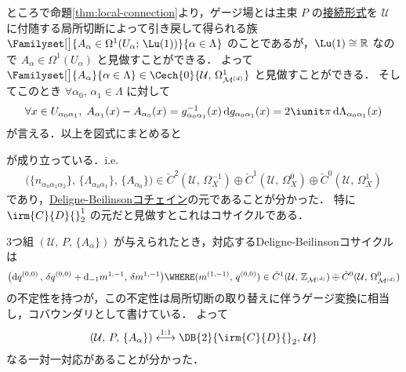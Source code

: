 \documentclass[TQFT_main]{subfiles}
\begin{document}
ところで命題\ref{thm:local-connection}より，ゲージ場とは主束 $P$ の\hyperref[def:connection]{接続形式}を $\mathcal{U}$ に付随する局所切断によって引き戻して得られる族 $\Familyset[\big]{A_\alpha \in \Omega^1(U_\alpha;\, \Lu(1))}{\alpha \in \Lambda}$ のことであるが，$\Lu(1) \cong \mathbb{R}$ なので $A_\alpha \in \Omega^1(U_\alpha)$ と見做すことができる．
よって $\Familyset[\big]{A_\alpha}{\alpha \in \Lambda} \in \Cech{0}{\mathcal{U},\, \Omega^1_{\mfdcal{M}{d}}}$ と見做すことができる．
そしてこのとき $\forall \alpha_0,\, \alpha_1 \in \Lambda$ に対して
\begin{align}
    \forall x \in U_{\alpha_0\alpha_1},\; A_{\alpha_1}(x) - A_{\alpha_0}(x) = g_{\alpha_0\alpha_1}^{-1}(x) \dd{g_{\alpha_0\alpha_1}(x)} = 2 \iunit \pi \dd{\Lambda_{\alpha_0\alpha_1}(x)}
\end{align}
が言える．以上を図式にまとめると
\begin{center}
\end{center}
が成り立っている．i.e.
\begin{align}
    \bigl( \{n_{\alpha_0\alpha_1\alpha_2}\},\, \{\Lambda_{\alpha_0\alpha_1}\},\, \{A_{\alpha_0}\} \bigr) \in \check{C}^{2}(\mathcal{U},\, \Omega^{-1}_X) \oplus \check{C}^{1}(\mathcal{U},\, \Omega^{0}_X) \oplus \check{C}^{0}(\mathcal{U},\, \Omega^{1}_X)
\end{align}
であり，\hyperref[def:Deligne-Beilinson]{Deligne-Beilinsonコチェイン}の元であることが分かった．
特に $\irm{C}{D}{}_2^1$ の元だと見做すとこれはコサイクルである．

3つ組 $(\mathcal{U},\, P,\, \{A_\alpha\})$ が与えられたとき，対応するDeligne-Beilinsonコサイクルは
\begin{align}
    \bigl( \dd{q^{(0,0)}},\, \delta q^{(0,0)} + \dd_{-1}m^{1,-1},\, \delta m^{1,-1} \bigr) \WHERE (m^{(1,-1)},\, q^{(0,0)}) \in \check{C}^{1}(\mathcal{U},\, \mathbb{Z}_{\mfdcal{M}{d}}) \oplus \check{C}^{0}(\mathcal{U},\, \Omega^0_{\mfdcal{M}{d}})
\end{align}
の不定性を持つが，この不定性は局所切断の取り替えに伴うゲージ変換に相当し，コバウンダリとして書けている．
よって
\begin{align}
    (\mathcal{U},\, P,\, \{A_\alpha\}) \overset{1:1}{\longleftrightarrow} \DB{2}{\irm{C}{D}{}_2,\, \mathcal{U}}
\end{align}
なる一対一対応があることが分かった．
\end{document}
